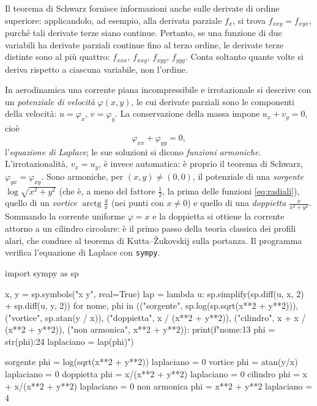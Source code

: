 Il teorema di Schwarz fornisce informazioni anche sulle derivate di ordine superiore:
applicandolo, ad esempio, alla derivata parziale $f_{x}$, si trova $f_{xxy}=f_{xyx}$, purché
tali derivate terze siano continue. Pertanto, se una funzione di due variabili ha
derivate parziali continue fino al terzo ordine, le derivate terze distinte sono al più
quattro: $f_{xxx}$, $f_{xxy}$,
$f_{xyy}$, $f_{yyy}$. Conta soltanto quante volte si deriva rispetto a ciascuna variabile,
non l'ordine.

\begin{idea}
In aerodinamica una corrente piana incompressibile e irrotazionale si descrive con un
\emph{potenziale di velocità} $\varphi(x,y)$, le cui derivate parziali sono le componenti
della velocità: $u=\varphi_{x}$, $v=\varphi_{y}$. La conservazione della massa impone
$u_{x}+v_{y}=0$, cioè
\begin{equation}\label{eq:laplace}
  \varphi_{xx}+\varphi_{yy}=0 ,
\end{equation}
l'\emph{equazione di Laplace}; le sue soluzioni si dicono \emph{funzioni armoniche}.
L'irrotazionalità, $v_{x}=u_{y}$, è invece automatica: è proprio il teorema di Schwarz,
$\varphi_{yx}=\varphi_{xy}$. Sono armoniche, per $(x,y)\neq(0,0)$, il potenziale di una
\emph{sorgente} $\log\sqrt{x^{2}+y^{2}}$ (che è, a meno del fattore $\frac12$, la prima delle funzioni
\eqref{eq:radiali}), quello di un \emph{vortice} $\operatorname{arctg}\frac yx$ (nei punti
con $x\neq0$) e quello di una \emph{doppietta} $\frac{x}{x^{2}+y^{2}}$. Sommando la corrente uniforme $\varphi=x$ e la
doppietta si ottiene la corrente attorno a un cilindro circolare: è il primo passo della
teoria classica dei profili alari, che conduce al teorema di Kutta--Žukovskij sulla
portanza. Il programma verifica l'equazione di Laplace con \texttt{sympy}.
\end{idea}

\begin{python}
import sympy as sp

x, y = sp.symbols("x y", real=True)
lap = lambda u: sp.simplify(sp.diff(u, x, 2) + sp.diff(u, y, 2))
for nome, phi in (("sorgente", sp.log(sp.sqrt(x**2 + y**2))),
                  ("vortice", sp.atan(y / x)),
                  ("doppietta", x / (x**2 + y**2)),
                  ("cilindro", x + x / (x**2 + y**2)),
                  ("non armonica", x**2 + y**2)):
    print(f"{nome:13} phi = {str(phi):24}  laplaciano = {lap(phi)}")
\end{python}
\begin{risultato}
sorgente      phi = log(sqrt(x**2 + y**2))    laplaciano = 0
vortice       phi = atan(y/x)                 laplaciano = 0
doppietta     phi = x/(x**2 + y**2)           laplaciano = 0
cilindro      phi = x + x/(x**2 + y**2)       laplaciano = 0
non armonica  phi = x**2 + y**2               laplaciano = 4
\end{risultato}

